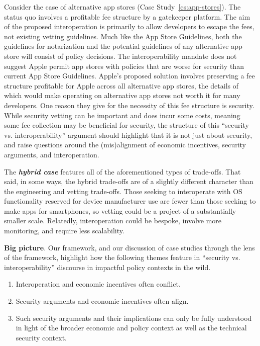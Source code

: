 \documentclass[letterpaper,twocolumn,10pt]{article}
\newcommand{\bi}[1]{\textbf{\textit{#1}}}
\newcommand{\subh}[1]{\smallskip \noindent \textbf{{#1}}.}
\renewcommand{\paragraph}[1]{\subh{#1}}
\begin{document}
Consider the case of alternative app stores (Case Study~\ref{cs:app-stores}). The status quo involves a profitable fee structure by a gatekeeper platform. The aim of the proposed interoperation is primarily to allow developers to escape the fees, not existing vetting guidelines. 
Much like the App Store Guidelines, both the guidelines for notarization and the potential guidelines of any alternative app store will consist of policy decisions. The interoperability mandate does not suggest Apple permit app stores with policies that are worse for security than current App Store Guidelines. 
Apple's proposed solution involves preserving a fee structure profitable for Apple across all alternative app stores, the details of which would make operating on alternative app stores not worth it for many developers. One reason they give for the necessity of this fee structure is security. While security vetting can be important and does incur some costs, meaning some fee collection may be beneficial for security, the structure of this ``security vs. interoperability'' argument should highlight that it is not just about security, and raise questions around the (mis)alignment of economic incentives, security arguments, and interoperation.

The \bi{hybrid case} features all of the aforementioned types of trade-offs. That said, in some ways, the hybrid trade-offs are of a slightly different character than the engineering and vetting trade-offs. Those seeking to interoperate with OS functionality reserved for device manufacturer use are fewer than those seeking to make apps for smartphones, so vetting could be a project of a substantially smaller scale. Relatedly, interoperation could be bespoke, involve more monitoring, and require less scalability. 


\paragraph{Big picture}
Our framework, and our discussion of case studies through the lens of the framework, highlight how the following themes feature in ``security vs. interoperability'' discourse in impactful policy contexts in the wild.
\begin{enumerate}
    \item Interoperation and economic incentives often conflict.
    \item Security arguments and economic incentives often align.
    \item Such security arguments and their implications can only be fully understood in light of the broader economic and policy context as well as the technical security context.
\end{enumerate}
\end{document}
